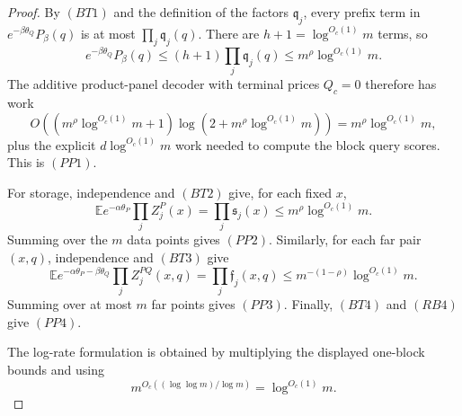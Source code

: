\documentclass[10pt]{article}
\theoremstyle{definition}
\newcommand{\E}{\mathbb{E}}
\begin{document}
\begin{proof}
   By \((BT1)\) and the definition of the factors \(\mathfrak q_j\), every
   prefix term in \(e^{-\beta\theta_Q}P_\beta(q)\) is at most
   \(\prod_j\mathfrak q_j(q)\).  There are \(h+1=\log^{O_c(1)}m\) terms, so
   \[
      e^{-\beta\theta_Q}P_\beta(q)
      \le
      (h+1)\prod_j\mathfrak q_j(q)
      \le m^\rho\log^{O_c(1)}m .
   \]
   The additive product-panel decoder with terminal prices \(Q_c=0\) therefore
   has work
   \[
      O\!\left(
      (m^\rho\log^{O_c(1)}m+1)\log(2+m^\rho\log^{O_c(1)}m)
      \right)
      =
      m^\rho\log^{O_c(1)}m,
   \]
   plus the explicit \(d\log^{O_c(1)}m\) work needed to compute the block
   query scores.  This is \((PP1)\).

   For storage, independence and \((BT2)\) give, for each fixed \(x\),
   \[
      \E e^{-\alpha\theta_P}\prod_j Z_j^P(x)
      =
      \prod_j\mathfrak s_j(x)
      \le m^\rho\log^{O_c(1)}m .
   \]
   Summing over the \(m\) data points gives \((PP2)\).  Similarly, for each far
   pair \((x,q)\), independence and \((BT3)\) give
   \[
      \E e^{-\alpha\theta_P-\beta\theta_Q}\prod_j Z_j^{PQ}(x,q)
      =
      \prod_j\mathfrak f_j(x,q)
      \le m^{-(1-\rho)}\log^{O_c(1)}m .
   \]
   Summing over at most \(m\) far points gives \((PP3)\).  Finally, \((BT4)\)
   and \((RB4)\) give \((PP4)\).

   The log-rate formulation is obtained by multiplying the displayed one-block
   bounds and using
   \[
      m^{O_c((\log\log m)/\log m)}=\log^{O_c(1)}m .
   \]
\end{proof}
\end{document}
